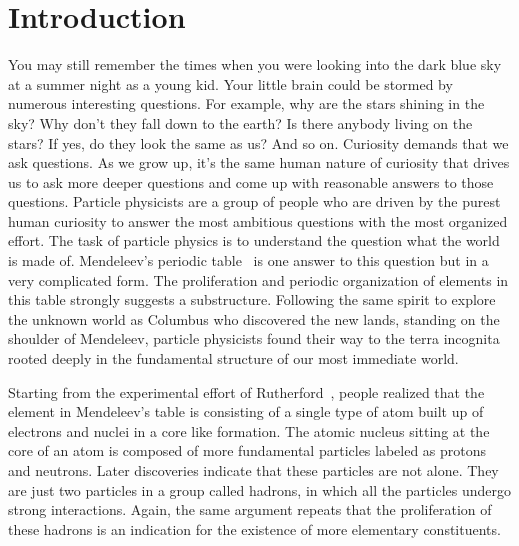 \chapter{Introduction}
\label{chp:introduction}
You may still remember the times when you were looking into the dark blue sky at
a summer night as a young kid. Your little brain could be stormed by numerous
interesting questions. For example, why are the stars shining in the sky? Why
don't they fall down to the earth? Is there anybody living on the stars? If yes,
do they look the same as us? And so on. Curiosity demands that we ask questions.
As we grow up, it's the same human nature of curiosity that drives us to ask
more deeper questions and come up with reasonable answers to those questions.
Particle physicists are a group of people who are driven by the purest human
curiosity to answer the most ambitious questions with the most organized effort.
The task of particle physics is to understand the question what the world is
made of. Mendeleev's periodic table~\cite{Mende:1869} is one answer to this
question but in a very complicated form. The proliferation and periodic
organization of elements in this table strongly suggests a substructure.
Following the same spirit to explore the unknown world as Columbus who
discovered the new lands, standing on the shoulder of Mendeleev, particle
physicists found their way to the terra incognita rooted deeply in the
fundamental structure of our most immediate world.

Starting from the experimental effort of Rutherford~\cite{Rutherford:1911},
people realized that the element in Mendeleev's table is consisting of a single
type of atom built up of electrons and nuclei in a core like formation. The
atomic nucleus sitting at the core of an atom is composed of more fundamental
particles labeled as protons and neutrons. Later discoveries indicate that these
particles are not alone. They are just two particles in a group called hadrons,
in which all the particles undergo strong interactions. Again, the same argument
repeats that the proliferation of these hadrons is an indication for the
existence of more elementary constituents.

